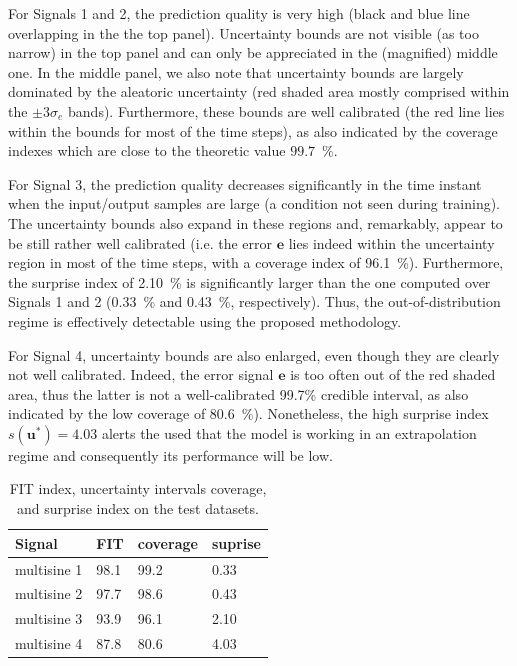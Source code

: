 \documentclass{ifacconf}
\newcommand{\tvec}[1]{{\mathbf{#1}}}
\begin{document}
For Signals 1 and 2, the prediction quality is very high (black and blue line overlapping in the the top panel). Uncertainty bounds are not visible (as too narrow) in the top panel and can only be appreciated in the (magnified) middle one. In the middle panel, we also note that uncertainty bounds are largely dominated by the aleatoric uncertainty (red shaded area mostly comprised within the $\pm 3 \sigma_e$ bands). Furthermore, these bounds are well calibrated (the red line lies within the bounds for most of the time steps), as also indicated by the coverage indexes which are close to the theoretic value $99.7$~\%.


For Signal 3, the prediction quality decreases significantly in the time instant when the input/output samples are large (a condition not seen during training). The uncertainty bounds also expand in these regions and, remarkably, appear to be still rather well calibrated (i.e. the error $\tvec{e}$ lies indeed within the uncertainty region in most of the time steps, with a coverage index of 96.1~\%). Furthermore, the surprise index of 2.10~\% is significantly larger than the one computed over Signals 1 and 2 (0.33~\% and 0.43~\%, respectively).
Thus, the out-of-distribution regime is effectively detectable using the proposed methodology.

For Signal 4, uncertainty bounds are also enlarged, even though they are clearly not well calibrated. Indeed, the error signal $\tvec{e}$ is 
too often out of the red shaded area, thus the latter is not a well-calibrated 99.7\% credible interval, as also indicated by the low coverage of 80.6~\%). Nonetheless, the high surprise index $s(\tvec{u}^*)=4.03$  alerts the used that the model is working in an extrapolation regime and consequently its performance will be low.

\begin{table}%
    \centering
    \begin{tabular}{|l||l|l|l|}
    \hline
    Signal &  FIT & coverage & suprise \\
    \hline
    multisine 1 &98.1 & 99.2 & 0.33\\
    multisine 2 &97.7 & 98.6 & 0.43\\
    multisine 3 &93.9 & 96.1 & 2.10\\
    multisine 4 &87.8 & 80.6 & 4.03  \\
    \hline
    \end{tabular}
    \caption{FIT index, uncertainty intervals coverage, and surprise index on the test datasets.}
    \label{tab:wh_results}
\end{table}
\end{document}
